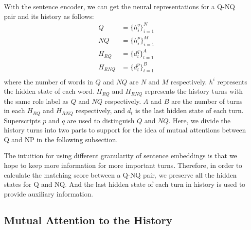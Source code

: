 With the sentence encoder, we can get the neural representations for a Q-NQ pair and its history as follows:
\begin{equation}
\begin{aligned}
Q&=\{h_i^q\}_{i=1}^{N}\\
NQ&= \{h_i^p\}_{i=1}^{M}\\
H_{RQ}&=\{d_t^q\}_{t=1}^{A}\\
H_{RNQ}&=\{d_t^p\}_{t=1}^{B}\\
\end{aligned}
\end{equation}
where the number of words in $Q$ and $NQ$ are $N$ and $M$ respectively. $h^i$ represents the hidden state of each word. $H_{RQ}$ and $H_{RNQ}$ represents the history turns with the same role label as $Q$ and $NQ$ respectively. $A$ and $B$ are the number of turns in each $H_{RQ}$ and $H_{RNQ}$ respectively, and $d_t$ is the last hidden state of each turn. Superscripts $p$ and $q$ are used to distinguish $Q$ and $NQ$. Here, we divide the history turns into 
two parts to support for the idea of mutual attentions between Q and NP
in the following subsection.

The intuition for using different granularity of sentence embeddings is that we hope to keep more information for more important turns. Therefore, in order to calculate the matching score between a Q-NQ pair, we preserve all the hidden states for Q and NQ. And the last hidden state of each turn in history is used to provide auxiliary information.





\subsection{Mutual Attention to the History}

